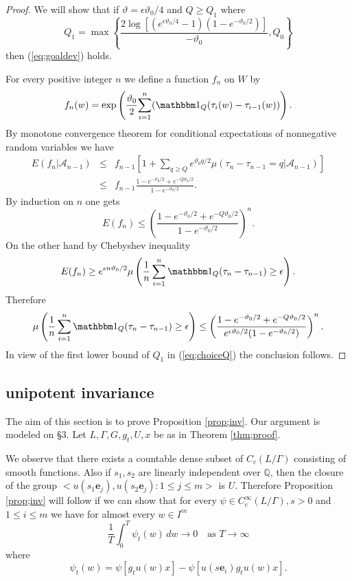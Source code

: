 \documentclass[12pt]{amsart}
\theoremstyle{definition}
\theoremstyle{remark}
\numberwithin{equation}{section}
\begin{document}
\begin{proof}
We will show that if $\vartheta=\epsilon\vartheta_0/4$ and $Q\ge Q_1$ where 
\begin{equation}\label{eq;choiceQ}
Q_1=\max\left\{
\frac{2\log[(e^{\epsilon\vartheta_0/4}-1)(1-e^{-\vartheta_0/2})]}
{-\vartheta_0}, Q_0\right\}
\end{equation}
then (\ref{eq;goaldev}) holds. 

For every positive integer  $n$ we define a function $f_n$ on
$W $ by
 \[
 f_n(w)=\exp\left (\frac{\vartheta_0}{2}{\sum_{i=1}^n ( \mathbbm 1 _Q  ( \tau_{i}(w)-\tau_{i-1}(w))} \right).
 \]
 By monotone convergence theorem for conditional expectations of nonnegative random variables 
 we have 
 \begin{eqnarray*}
E(f_n|\mathcal A_{n-1}) & \le &  f_{n-1}\left [1+
\mathcal \sum_{q\ge Q} e^{\vartheta_0 q/2}
\mu (\tau_n-\tau_{n-1}=q|\mathcal A_{n-1})
\right] \\
 & \le & f_{n-1}\frac{1-e^{-\vartheta_0/2}+e^{-Q\vartheta_0/2}}{1-e^{-\vartheta_0/2}}.
 \end{eqnarray*}
By induction on $n$ one gets
 \[
E(f_n)\le \left (\frac{1-e^{-\vartheta_0/2}+e^{-Q\vartheta_0/2}}{1-e^{-\vartheta_0/2}}
\right )^n.
 \]
On the other hand by Chebyshev inequality 
\[
E(f_n)\ge
 e^{\epsilon n\vartheta_0/2}\mu \left(\frac{1}{n}\sum_{i=1}^n \mathbbm 1 _Q  ( \tau_{n}-\tau_{n-1})\ge\epsilon
\right).
\]
Therefore 
\begin{equation}\label{eq;derivation}
\mu\left(\frac{1}{n}\sum_{i=1}^n \mathbbm 1 _Q  ( \tau_{n}-\tau_{n-1})\ge \epsilon
\right)
\le \left(\frac{1-e^{-\vartheta_0/2}+e^{-Q\vartheta_0/2}}
{e^{\epsilon \vartheta_0/2}(1-e^{-\vartheta_0/2})}
\right)^n.
\end{equation}
In view of  the   first  lower bound of $Q_1$ in (\ref{eq;choiceQ}) 
the conclusion follows. 
\end{proof}

\subsection{unipotent invariance}
The aim of this section is to prove Proposition \ref{prop;inv}. 
Our argument is modeled on  \cite{ce} \S 3. 
Let $L, \Gamma, G, g_t, U,x$ be   as  in Theorem \ref{thm;proof}.

We observe that there exists a countable
dense subset of $C_c(L/\Gamma)$  consisting of  smooth functions.
   Also if $s_1, s_2$ are linearly independent over 
$\mathbb Q$, then the closure of the group $<u(s_1\mathbf e_j), u(s_2\mathbf e_j): 1\le j\le m>$ is $U$. 
Therefore Proposition \ref{prop;inv} will follow if  we can show that for 
every  
 $\psi \in C_c^\infty(L/\Gamma), s>0$ and $1\le i\le m$
we have for almost every $w\in I^m$
\begin{equation}\label{eq: goal}
\frac{1}{T}\int_0^T \psi_t(w)\, dw\to 0\quad \mbox{as } T\to\infty
\end{equation}
where 
\[
\psi_t(w)  =  \psi[g_tu(w)x]-\psi[u(s\mathbf e_i)g_tu(w)x].
\]
\end{document}
